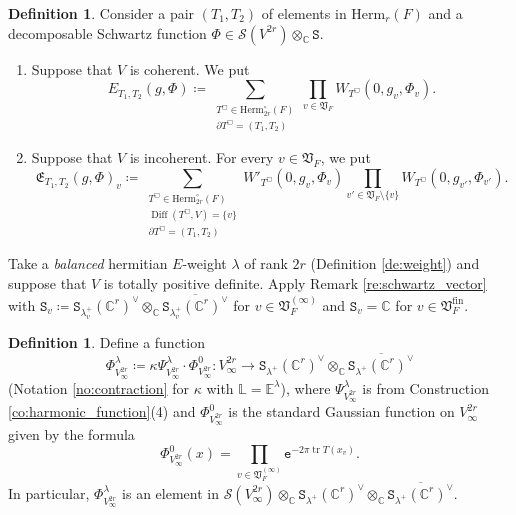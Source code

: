 \documentclass[12pt]{amsart}
\numberwithin{equation}{section}
\theoremstyle{plain}
\theoremstyle{definition}
\newtheorem{definition}[proposition]{Definition}
\theoremstyle{remark}
\renewcommand{\d}[1]{\mathbb{#1}}
\newcommand{\f}[1]{\mathfrak{#1}}
\renewcommand{\r}[1]{\mathrm{#1}}
\newcommand{\s}[1]{\mathscr{#1}}
\renewcommand{\(}{\left(}
\renewcommand{\)}{\right)}
\newcommand{\ol}[1]{\overline{#1}{}}
\newcommand{\dC}{\d C}
\newcommand{\dE}{\d E}
\newcommand{\dL}{\d L}
\newcommand{\fE}{\f E}
\newcommand{\fV}{\f V}
\newcommand{\sS}{\s S}
\newcommand{\tS}{\mathtt{S}}
\newcommand{\te}{\mathtt{e}}
\newcommand{\fin}{\r{fin}}
\newcommand{\Herm}{\r{Herm}}
\DeclareMathOperator{\Diff}{Diff}
\DeclareMathOperator{\tr}{tr}
\begin{document}
\begin{definition}\label{de:analytic_kernel}
Consider a pair $(T_1,T_2)$ of elements in $\Herm_r(F)$ and a decomposable Schwartz function $\Phi\in\sS(V^{2r})\otimes_\dC\tS$.
\begin{enumerate}
  \item Suppose that $V$ is coherent. We put
    \[
    E_{T_1,T_2}(g,\Phi)\coloneqq\sum_{\substack{T^\Box\in\Herm_{2r}^\circ(F)\\\partial T^\Box=(T_1,T_2)}}
    \prod_{v\in\fV_F} W_{T^\Box}(0,g_v,\Phi_v).
    \]

  \item Suppose that $V$ is incoherent. For every $v\in\fV_F$, we put
    \[
    \fE_{T_1,T_2}(g,\Phi)_v\coloneqq\sum_{\substack{T^\Box\in\Herm_{2r}^\circ(F)\\ \Diff(T^\Box,V)=\{v\}\\ \partial T^\Box=(T_1,T_2)}}
    W'_{T^\Box}(0,g_v,\Phi_v)\prod_{v'\in\fV_F\setminus\{v\}}W_{T^\Box}(0,g_{v'},\Phi_{v'}).
    \]
\end{enumerate}
\end{definition}













Take a \emph{balanced} hermitian $E$-weight $\lambda$ of rank $2r$ (Definition \ref{de:weight}) and suppose that $V$ is totally positive definite. Apply Remark \ref{re:schwartz_vector} with $\tS_v\coloneqq\tS_{\lambda_v^+}(\dC^r)^\vee\otimes_\dC\ol{\tS_{\lambda_v^+}(\dC^r)^\vee}$ for $v\in\fV_F^{(\infty)}$ and $\tS_v=\dC$ for $v\in\fV_F^\fin$.


\begin{definition}\label{de:doubling_schwartz}
Define a function
\[
\Phi_{V_\infty^{2r}}^\lambda\coloneqq\kappa\Psi_{V_\infty^{2r}}^\lambda\cdot\Phi^0_{V_\infty^{2r}}\colon V_\infty^{2r}\to
\tS_{\lambda^+}(\dC^r)^\vee\otimes_\dC\ol{\tS_{\lambda^+}(\dC^r)^\vee}
\]
(Notation \ref{no:contraction} for $\kappa$ with $\dL=\dE^\lambda$), where $\Psi_{V_\infty^{2r}}^\lambda$ is from Construction \ref{co:harmonic_function}(4) and $\Phi^0_{V_\infty^{2r}}$ is the standard Gaussian function on $V_\infty^{2r}$ given by the formula
\[
\Phi^0_{V_\infty^{2r}}(x)=\prod_{v\in\fV_F^{(\infty)}}\te^{-2\pi\tr T(x_v)}.
\]
In particular, $\Phi^\lambda_{V_\infty^{2r}}$ is an element in $\sS(V_\infty^{2r})\otimes_\dC\tS_{\lambda^+}(\dC^r)^\vee\otimes_\dC\ol{\tS_{\lambda^+}(\dC^r)^\vee}$.
\end{definition}
\end{document}

